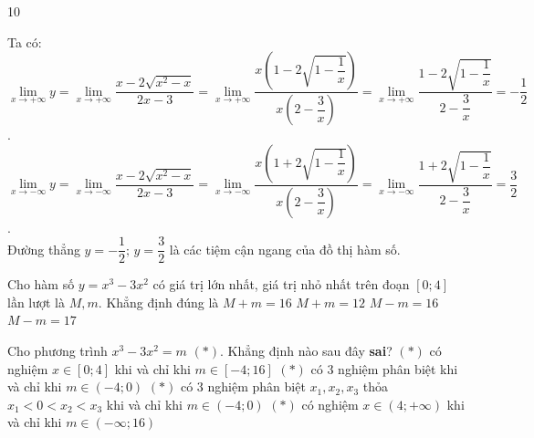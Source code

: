 \begin{indapan}{10}
\begin{ex}
{		Ta có:
		$\lim\limits_{x\to+\infty}y=\lim\limits_{x\to+\infty}\dfrac{x-2\sqrt{x^2-x}}{2x-3}=\lim\limits_{x\to+\infty}\dfrac{x\left( 1-2\sqrt{1-\dfrac{1}{x}}\right) }{x\left(2-\dfrac{3}{x}\right)}=\lim\limits_{x\to+\infty}\dfrac{1-2\sqrt{1-\dfrac{1}{x}}}{2-\dfrac{3}{x}}=-\dfrac{1}{2}$.\\
		$\lim\limits_{x\to-\infty}y=\lim\limits_{x\to-\infty}\dfrac{x-2\sqrt{x^2-x}}{2x-3}=\lim\limits_{x\to-\infty}\dfrac{x\left( 1+2\sqrt{1-\dfrac{1}{x}}\right) }{x\left( 2-\dfrac{3}{x}\right) }=\lim\limits_{x\to-\infty}\dfrac{1+2\sqrt{1-\dfrac{1}{x}}}{2-\dfrac{3}{x}}=\dfrac{3}{2}$.\\
		Đường thẳng $y=-\dfrac{1}{2};\,y=\dfrac{3}{2}$ là các tiệm cận ngang của đồ thị hàm số.} 
\end{ex} 
\begin{ex}%
	Cho hàm số $y=x^3-3x^2$ có giá trị lớn nhất, giá trị nhỏ nhất trên đoạn $\left[0;4\right]$ lần lượt là $M, m.$ Khẳng định đúng là
	\choice 
	{$M+m=16$}
	{\True $M+m=12$}
	{$M-m=16$}
	{$M-m=17$} 
\end{ex} 
\begin{ex}%
	Cho phương trình $x^3-3x^2=m$ $(*)$. Khẳng định nào sau đây \textbf{sai}?
	\choice 
	{$(*)$ có nghiệm $x\in\left[0;4\right]$ khi và chỉ khi $m\in\left[-4;16\right]$} 
	{$(*)$ có $3$ nghiệm phân biệt khi và chỉ khi $m\in (-4;0)$} 
	{$(*)$ có $3$ nghiệm phân biệt $x_1, x_2, x_3$ thỏa $x_1<0<x_2<x_3$ khi và chỉ khi $m\in (-4;0)$} 
	{\True $(*)$ có nghiệm $x\in (4;+\infty )$ khi và chỉ khi $m\in (-\infty ;16)$} 
\end{ex}
\end{indapan}
